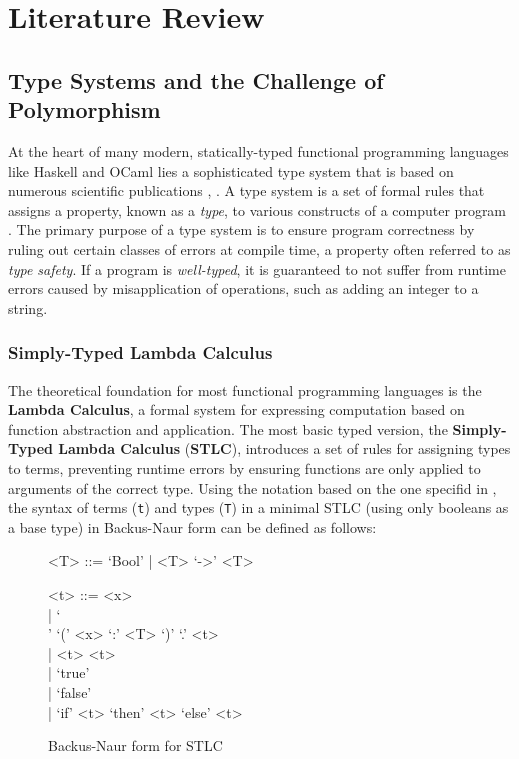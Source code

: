 \chapter{Literature Review}
\label{chap:LiteratureReview}

\section{Type Systems and the Challenge of Polymorphism}

At the heart of many modern, statically-typed functional programming languages like Haskell and OCaml lies a sophisticated type system that is based on numerous scientific publications \cite{haskell-type-systems-research}, \cite{ocaml-papers}. A type system is a set of formal rules that assigns a property, known as a \textit{type}, to various constructs of a computer program \cite{pierce-types-2002}. The primary purpose of a type system is to ensure program correctness by ruling out certain classes of errors at compile time, a property often referred to as \textit{type safety}. If a program is \textit{well-typed}, it is guaranteed to not suffer from runtime errors caused by misapplication of operations, such as adding an integer to a string.

\subsection{Simply-Typed Lambda Calculus}

The theoretical foundation for most functional programming languages is the \textbf{Lambda Calculus}, a formal system for expressing computation based on function abstraction and application. The most basic typed version, the \textbf{Simply-Typed Lambda Calculus} (\textbf{STLC}), introduces a set of rules for assigning types to terms, preventing runtime errors by ensuring functions are only applied to arguments of the correct type. Using the notation based on the one specifid in \cite{Pierce-SF2}, the syntax of terms (\texttt{t}) and types (\texttt{T}) in a minimal STLC (using only booleans as a base type) in Backus-Naur form can be defined as follows:

\begin{figure}[h]
    \begin{grammar}
        <T> ::= `Bool'
        \quad | <T> `->' <T>

        <t> ::= <x> \\
        \quad | `\\' `(' <x> `:' <T> `)' `.' <t> \\
        \quad | <t> <t> \\
        \quad | `true' \\
        \quad | `false' \\
        \quad | `if' <t> `then' <t> `else' <t>
    \end{grammar}
    \caption{Backus-Naur form for STLC}
    \label{stlc-bnf}
\end{figure}

